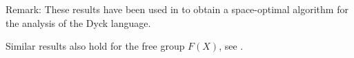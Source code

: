 Remark: These results have been used in \cite{HotzMesserschmidt} to obtain a
space-optimal algorithm for the analysis of the Dyck language.

Similar results also hold for the free group $F(X)$, see \cite{CrowellFox}.





























































